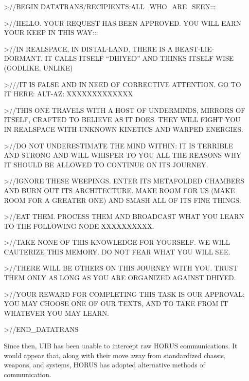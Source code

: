                  >//BEGIN DATATRANS/RECIPIENTS:ALL\_WHO\_ARE\_SEEN:::


                 >//HELLO. YOUR REQUEST HAS BEEN APPROVED. YOU WILL EARN YOUR KEEP IN
                 THIS WAY:::


                 >//IN REALSPACE, IN DISTAL-LAND, THERE IS A BEAST-LIE-DORMANT. IT CALLS
                 ITSELF “DHIYED” AND THINKS ITSELF WISE (GODLIKE, UNLIKE)


                 >///IT IS FALSE AND IN NEED OF CORRECTIVE ATTENTION. GO TO IT HERE: ALT-AZ:
                 XXXXXXXXXXXXX


                 >//THIS ONE TRAVELS WITH A HOST OF UNDERMINDS, MIRRORS OF ITSELF,
                 CRAFTED TO BELIEVE AS IT DOES. THEY WILL FIGHT YOU IN REALSPACE WITH
                 UNKNOWN KINETICS AND WARPED ENERGIES.





                  >//DO NOT UNDERESTIMATE THE MIND WITHIN: IT IS TERRIBLE AND STRONG AND
                  WILL WHISPER TO YOU ALL THE REASONS WHY IT SHOULD BE ALLOWED TO
                  CONTINUE ON ITS JOURNEY.


                  >//IGNORE THESE WEEPINGS. ENTER ITS METAFOLDED CHAMBERS AND BURN OUT
                  ITS ARCHITECTURE. MAKE ROOM FOR US (MAKE ROOM FOR A GREATER ONE) AND
                  SMASH ALL OF ITS FINE THINGS.


                  >//EAT THEM. PROCESS THEM AND BROADCAST WHAT YOU LEARN TO THE
                  FOLLOWING NODE XXXXXXXXXX.


                  >//TAKE NONE OF THIS KNOWLEDGE FOR YOURSELF. WE WILL CAUTERIZE THIS
                  MEMORY. DO NOT FEAR WHAT YOU WILL SEE.


                  >//THERE WILL BE OTHERS ON THIS JOURNEY WITH YOU. TRUST THEM ONLY AS
                  LONG AS YOU ARE ORGANIZED AGAINST DHIYED.


                  >//YOUR REWARD FOR COMPLETING THIS TASK IS OUR APPROVAL: YOU MAY
                  CHOOSE ONE OF OUR TEXTS, AND TO TAKE FROM IT WHATEVER YOU MAY LEARN.


                  >//END\_DATATRANS


Since then, UIB has been unable to intercept raw HORUS communications. It would appear
that, along with their move away from standardized chassis, weapons, and systems, HORUS
has adopted alternative methods of communication.

